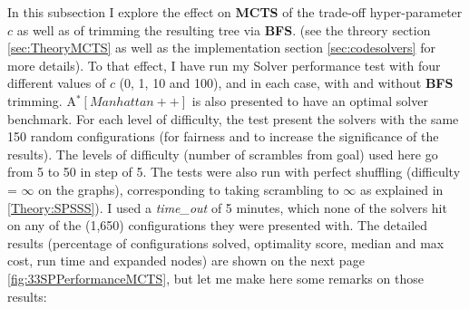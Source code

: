\label{sec:MTCSHyperParamsEffect}
In this subsection I explore the effect on \textbf{MCTS} of the trade-off hyper-parameter $c$ as well as of trimming the resulting tree via \textbf{BFS}. (see the threory section \ref{sec:TheoryMCTS} as well as the implementation section \ref{sec:codesolvers} for more details). To that effect, I have run my Solver performance test with four different values of $c$ (0, 1, 10 and 100), and in each case, with and without \textbf{BFS} trimming. A$^{*}[Manhattan++]$ is also presented to have an optimal solver benchmark. For each level of difficulty, the test present the solvers with the same 150 random configurations (for fairness and to increase the significance of the results). The levels of difficulty (number of scrambles from goal) used here go from 5 to 50 in step of 5. The tests were also run with perfect shuffling (difficulty = $\infty$ on the graphs), corresponding to taking scrambling to $\infty$ as explained in \ref{Theory:SPSSS}). I used a \textit{time\_out} of 5 minutes, which none of the solvers hit on any of the (1,650) configurations they were presented with.
The detailed results (percentage of configurations solved, optimality score, median and max cost, run time and expanded nodes) are shown on the next page \ref{fig:33SPPerformanceMCTS}, but let me make here some remarks on those results:
